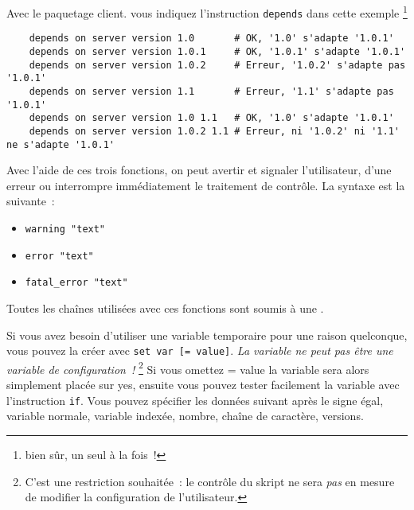     Avec le paquetage \og{}client\fg{}. vous indiquez l'instruction \texttt{depends}
	dans cette exemple \footnote{bien sûr, un seul à la fois~!}

\begin{example}
\begin{verbatim}
    depends on server version 1.0       # OK, '1.0' s'adapte '1.0.1'
    depends on server version 1.0.1     # OK, '1.0.1' s'adapte '1.0.1'
    depends on server version 1.0.2     # Erreur, '1.0.2' s'adapte pas '1.0.1'
    depends on server version 1.1       # Erreur, '1.1' s'adapte pas '1.0.1'
    depends on server version 1.0 1.1   # OK, '1.0' s'adapte '1.0.1'
    depends on server version 1.0.2 1.1 # Erreur, ni '1.0.2' ni '1.1' ne s'adapte '1.0.1'
\end{verbatim}
\end{example}



    Avec l'aide de ces trois fonctions, on peut avertir et signaler
    l’utilisateur, d’une erreur ou interrompre immédiatement le traitement
    de contrôle. La syntaxe est la suivante~:

    \begin{itemize}
    \item \verb+warning "text"+
    \item \verb+error "text"+
    \item \verb+fatal_error "text"+
    \end{itemize}

    Toutes les chaînes utilisées avec ces fonctions sont soumis à une
    .



    Si vous avez besoin d’utiliser une variable temporaire pour une raison
    quelconque, vous pouvez la créer avec \og{}\texttt{set var [= value]}\fg{}.
	\emph{La variable ne peut pas être une variable de configuration~!} \footnote{C'est
	une restriction souhaitée~: le contrôle du skript ne sera \emph{pas} en mesure de
	modifier la configuration de l'utilisateur.} Si vous omettez \og{}= value\fg{} la
	variable sera alors simplement placée sur \og{}yes\fg{}, ensuite vous pouvez tester
	facilement la variable avec l’instruction \texttt{if}. Vous pouvez spécifier les
	données suivant après le signe égal, variable normale, variable indexée, nombre,
	chaîne de caractère, versions.

